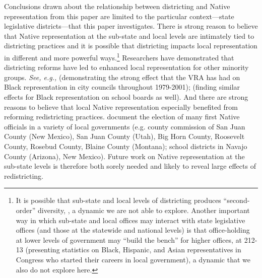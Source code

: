 \documentclass[12pt]{article}
\begin{document}
Conclusions drawn about the relationship between districting and Native representation from this paper are limited to the particular context—state legislative districts—that this paper investigates. There is strong reason to believe that Native representation at the sub-state and local levels are intimately tied to districting practices and it is possible that districting impacts local representation in different and more powerful ways.\footnote{It is possible that sub-state and local levels of districting produces ``second-order'' diversity, \cite{gerken2005secondorder}, a dynamic we are not able to explore. Another important way in which sub-state and local offices may interact with state legislative offices (and those at the statewide and national levels) is that office-holding at lower levels of government may ``build the bench'' for higher offices, \cite{greenwood2016fair} at 212-13 (presenting statistics on Black, Hispanic, and Asian representatives in Congress who started their careers in local government), a dynamic that we also do not explore here.} Researchers have demonstrated that districting reforms have led to enhanced local representation for other minority groups. \textit{See, e.g., }\cite{shah2013are} (demonstrating the strong effect that the VRA has had on Black representation in city councils throughout 1979-2001); \cite{marschall2010new} (finding similar effects for Black representation on school boards as well). And there are strong reasons to believe that local Native representation especially benefited from reforming redistricting practices. \cite{mccool2007native} document the election of many first Native officials in a variety of local governments (e.g. county commission of San Juan County (New Mexico), San Juan County (Utah), Big Horn County, Roosevelt County, Rosebud County, Blaine County (Montana); school districts in Navajo County (Arizona), New Mexico). Future work on Native representation at the sub-state levels is therefore both sorely needed and likely to reveal large effects of redistricting.
\end{document}
